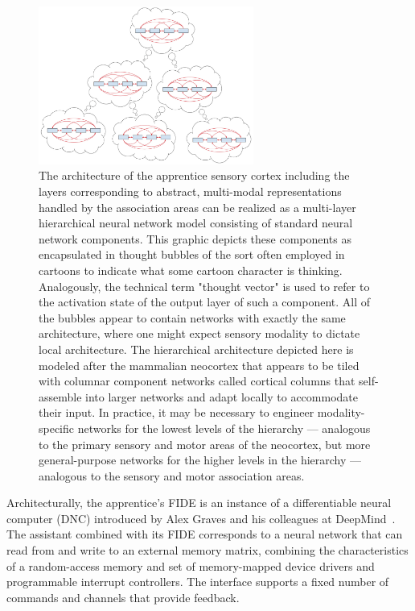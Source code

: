\documentclass[letterpaper,11pt]{article}
\def\urlh#1{{}}
\def\emdash{---}
\begin{document}
\begin{figure}
%
  \begin{center} 
    \includegraphics[width=200pt]{./figures/Posterior_Cortex_Semantic_Cloud_Memory.jpg} %
  \end{center}
%
  \caption{The architecture of the apprentice sensory cortex including the layers corresponding to abstract, multi-modal representations handled by the association areas can be realized as a multi-layer hierarchical neural network model consisting of standard neural network components. This graphic depicts these components as encapsulated in thought bubbles of the sort often employed in cartoons to indicate what some cartoon character is thinking. Analogously, the technical term "thought vector" is used to refer to the activation state of the output layer of such a component. All of the bubbles appear to contain networks with exactly the same architecture, where one might expect sensory modality to dictate local architecture. The hierarchical architecture depicted here is modeled after the mammalian neocortex that appears to be tiled with columnar component networks called cortical columns that self-assemble into larger networks and adapt locally to accommodate their input. In practice, it may be necessary to engineer modality-specific networks for the lowest levels of the hierarchy \emdash{} analogous to the primary sensory and motor areas of the neocortex, but more general-purpose networks for the higher levels in the hierarchy \emdash{} analogous to the sensory and motor association areas.}
%
  \label{fig_posterior}
%
\end{figure}


Architecturally, the apprentice's FIDE is an instance of a differentiable neural computer (DNC) introduced by Alex Graves and his colleagues at DeepMind~\cite{GravesetalNATURE-16}. The assistant combined with its FIDE corresponds to a neural network that can read from and write to an external memory matrix, combining the characteristics of a random-access memory and set of memory-mapped device drivers and programmable interrupt controllers. The interface supports a fixed number of commands and channels that provide feedback.
\end{document}
